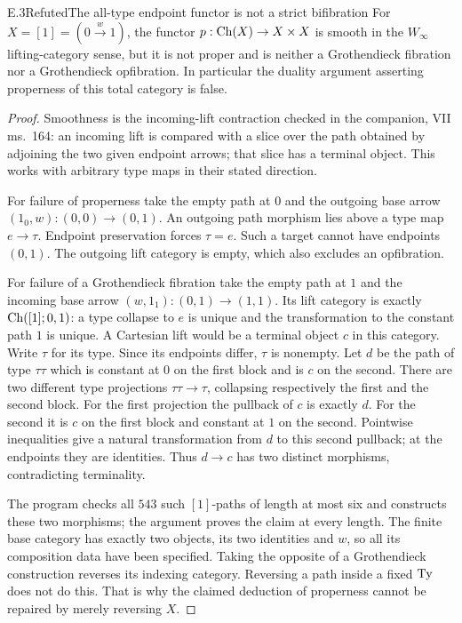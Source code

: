 \begin{result}{E.3}{Refuted}{The all-type endpoint functor is not a strict bifibration}
For $X=[1]=(0\xrightarrow w1)$, the functor $p:\operatorname{Ch}(X)\to X\times X$ is smooth in the $W_\infty$ lifting-category sense, but it is not proper and is neither a Grothendieck fibration nor a Grothendieck opfibration. In particular the duality argument asserting properness of this total category is false.
\end{result}
\begin{proof}
Smoothness is the incoming-lift contraction checked in the companion, VII ms.~164: an incoming lift is compared with a slice over the path obtained by adjoining the two given endpoint arrows; that slice has a terminal object. This works with arbitrary type maps in their stated direction.

For failure of properness take the empty path at $0$ and the outgoing base arrow $(1_0,w):(0,0)\to(0,1)$. An outgoing path morphism lies above a type map $e\to\tau$. Endpoint preservation forces $\tau=e$. Such a target cannot have endpoints $(0,1)$. The outgoing lift category is empty, which also excludes an opfibration.

For failure of a Grothendieck fibration take the empty path at $1$ and the incoming base arrow $(w,1_1):(0,1)\to(1,1)$. Its lift category is exactly $\operatorname{Ch}([1];0,1)$: a type collapse to $e$ is unique and the transformation to the constant path $1$ is unique. A Cartesian lift would be a terminal object $c$ in this category. Write $\tau$ for its type. Since its endpoints differ, $\tau$ is nonempty. Let $d$ be the path of type $\tau\tau$ which is constant at $0$ on the first block and is $c$ on the second. There are two different type projections $\tau\tau\to\tau$, collapsing respectively the first and the second block. For the first projection the pullback of $c$ is exactly $d$. For the second it is $c$ on the first block and constant at $1$ on the second. Pointwise inequalities give a natural transformation from $d$ to this second pullback; at the endpoints they are identities. Thus $d\to c$ has two distinct morphisms, contradicting terminality.

The program checks all $543$ such $[1]$-paths of length at most six and constructs these two morphisms; the argument proves the claim at every length. The finite base category has exactly two objects, its two identities and $w$, so all its composition data have been specified. Taking the opposite of a Grothendieck construction reverses its indexing category. Reversing a path inside a fixed $\mathrm{Ty}$ does not do this. That is why the claimed deduction of properness cannot be repaired by merely reversing $X$.
\end{proof}

